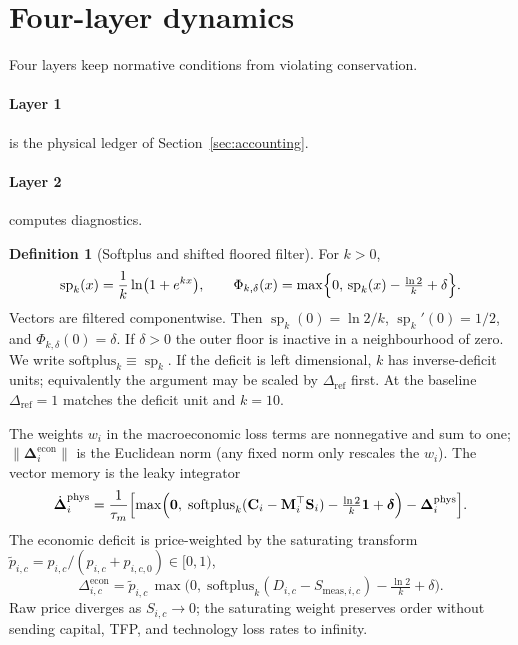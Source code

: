 \documentclass[11pt]{article}
\theoremstyle{definition}
\newtheorem{definition}{Definition}
\begin{document}
\section{Four-layer dynamics}
\label{sec:layers}

Four layers keep normative conditions from violating conservation.

\paragraph{Layer 1} is the physical ledger of Section~\ref{sec:accounting}.

\paragraph{Layer 2} computes diagnostics.
\begin{definition}[Softplus and shifted floored filter]
\label{def:phi}
For $k>0$,
\[
\operatorname{sp}_k(x)=\frac1k\ln\bigl(1+e^{kx}\bigr),\qquad
\Phi_{k,\delta}(x)=\max\Bigl\{0,\,\operatorname{sp}_k(x)-\tfrac{\ln 2}{k}+\delta\Bigr\}.
\]
Vectors are filtered componentwise. Then $\operatorname{sp}_k(0)=\ln 2/k$, $\operatorname{sp}_k'(0)=1/2$, and $\Phi_{k,\delta}(0)=\delta$. If $\delta>0$ the outer floor is inactive in a neighbourhood of zero. We write $\mathrm{softplus}_k\equiv\operatorname{sp}_k$. If the deficit is left dimensional, $k$ has inverse-deficit units; equivalently the argument may be scaled by $\Delta_{\mathrm{ref}}$ first. At the baseline $\Delta_{\mathrm{ref}}=1$ matches the deficit unit and $k=10$.
\end{definition} The weights $w_i$ in the macroeconomic loss terms are nonnegative and sum to one; $\|\boldsymbol\Delta_i^{\mathrm{econ}}\|$ is the Euclidean norm (any fixed norm only rescales the $w_i$). The vector memory is the leaky integrator
\[
\dot{\boldsymbol\Delta}_i^{\mathrm{phys}}
=\frac1{\tau_m}\Bigl[\max\Bigl(\mathbf 0,\;\mathrm{softplus}_k(\mathbf C_i-\mathbf M_i^\top\mathbf S_i)-\tfrac{\ln 2}{k}\mathbf 1+\boldsymbol\delta\Bigr)-\boldsymbol\Delta_i^{\mathrm{phys}}\Bigr].
\]
The economic deficit is price-weighted by the saturating transform $\tilde p_{i,c}=p_{i,c}/(p_{i,c}+p_{i,c,0})\in[0,1)$,
\[
\Delta_{i,c}^{\mathrm{econ}}=\tilde p_{i,c}\,\max\bigl(0,\;\mathrm{softplus}_k(D_{i,c}-S_{\mathrm{meas},i,c})-\tfrac{\ln 2}{k}+\delta\bigr).
\]
Raw price diverges as $S_{i,c}\to 0$; the saturating weight preserves order without sending capital, TFP, and technology loss rates to infinity.
\end{document}
